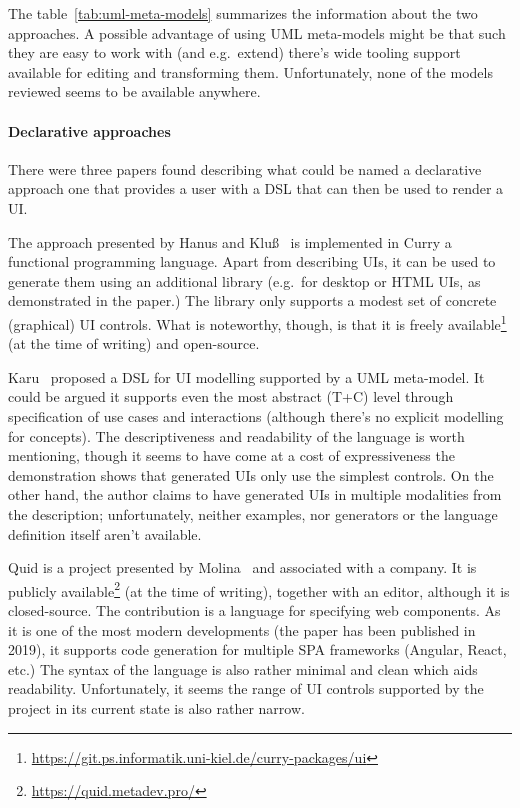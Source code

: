 The table~\ref{tab:uml-meta-models} summarizes the information about the two approaches.
A possible advantage of using UML meta-models might be that such they are easy to work with (and e.g.~extend)\,\textemdash\,there's wide tooling support available for editing and transforming them.
Unfortunately, none of the models reviewed seems to be available anywhere.

\paragraph{Declarative approaches}

There were three papers found describing what could be named a declarative approach\,\textemdash\,one that provides a user with a DSL that can then be used to render a UI\@.

The approach presented by Hanus and Kluß~\cite{Hanus2008-hm} is implemented in Curry\,\textemdash\,a functional programming language.
Apart from describing UIs, it can be used to generate them using an additional library (e.g.\ for desktop or HTML UIs, as demonstrated in the paper.)
The library only supports a modest set of concrete (graphical) UI controls.
What is noteworthy, though, is that it is freely available\footnote{\url{https://git.ps.informatik.uni-kiel.de/curry-packages/ui}} (at the time of writing) and open-source.

Karu~\cite{Karu2013-po} proposed a DSL for UI modelling supported by a UML meta-model.
It could be argued it supports even the most abstract (T+C) level through specification of use cases and interactions (although there's no explicit modelling for concepts).
The descriptiveness and readability of the language is worth mentioning, though it seems to have come at a cost of expressiveness\,\textemdash\,the demonstration shows that generated UIs only use the simplest controls.
On the other hand, the author claims to have generated UIs in multiple modalities from the description;
unfortunately, neither examples, nor generators or the language definition itself aren't available.

Quid is a project presented by Molina~\cite{molina2019quid} and associated with a company.
It is publicly available\footnote{\url{https://quid.metadev.pro/}} (at the time of writing), together with an editor, although it is closed-source.
The contribution is a language for specifying web components.
As it is one of the most modern developments (the paper has been published in 2019), it supports code generation for multiple SPA frameworks (Angular, React, etc.)
The syntax of the language is also rather minimal and clean which aids readability.
Unfortunately, it seems the range of UI controls supported by the project in its current state is also rather narrow.

